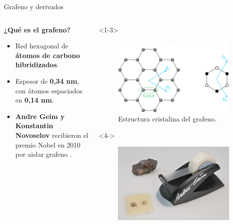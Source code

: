 \documentclass[aspectratio=169]{beamer}
\begin{document}
	\begin{frame}{Grafeno y derivados}
		\begin{columns}
			\begin{column}{0.6\textwidth}
				\only<1->\textbf{¿Qué es el grafeno?}
				\begin{itemize}[<+(1)->]
					\item Red hexagonal de \textbf{átomos de carbono hibridizados}.
					\item Espesor de \textbf{0,34 nm}, con átomos espaciados en \textbf{0,14 nm}.
					\item \textbf{Andre Geim y Konstantin Novoselov} recibieron el premio Nobel en 2010 por aislar grafeno \citep{Novoselov2004}.
				\end{itemize}
			\end{column}
			\begin{column}{0.4\textwidth}
				\begin{onlyenv}<1-3>
					\begin{figure}
						\includegraphics[width=\textwidth]{graphene_lattice.pdf}
						\caption{Estructura cristalina del grafeno.}
					\end{figure}
				\end{onlyenv}
				\begin{onlyenv}<4->
					\begin{figure}
						\includegraphics[width=\textwidth]{Nobel_graphene.png}

\end{figure}
\end{onlyenv}
\end{column}
\end{columns}
\end{frame}
\end{document}
